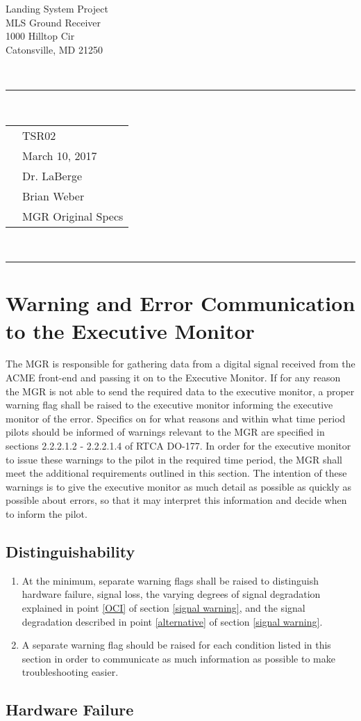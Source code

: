 \documentclass[11pt]{article}
\newcommand{\header}[5]{
\begin{centering}
\parbox{6.8in}{
\begin{flushright}
\begin{spacing}{.8}
{\fontfamily{cmss}{\large{\textbf{#1}}\\}}
\small{#2\\
#3\\
#4\\
#5}\\
\end{spacing}
\end{flushright}
\vspace{-7.5mm}
}\\
\rule{\textwidth}{0.5pt}\\
\vspace{-4mm}
\end{centering}
}
\newcommand{\documentinfo}[5]{
\begin{centering}
\parbox{6.8in}{
\begin{spacing}{1}
\begin{flushleft}
\begin{tabular}{l l}
\fontfamily{cmss}{\textbf{DOC \#: }} & #1 \\
\fontfamily{cmss}{\textbf{DATE: }} & #2 \\
\fontfamily{cmss}{\textbf{TO: }} & #3 \\
\fontfamily{cmss}{\textbf{FROM: }} & #4 \\
\fontfamily{cmss}{\textbf{SUBJECT: }} & #5 \\
\end{tabular}\\
\rule{\textwidth}{1pt}
\end{flushleft}
\end{spacing}
}
\end{centering}
}
\begin{document}
\header{CMPE349}{Landing System Project}{MLS Ground Receiver}{1000 Hilltop Cir}{Catonsville, MD 21250}

\documentinfo{TSR02}{March 10, 2017}{Dr. LaBerge}{Brian Weber}{MGR Original Specs}

\section{Warning and Error Communication to the Executive Monitor}
The MGR is responsible for gathering data from a digital signal received from the ACME front-end and passing it on to the Executive Monitor. If for any reason the MGR is not able to send the required data to the executive monitor, a proper warning flag shall be raised to the executive monitor informing the executive monitor of the error. Specifics on for what reasons and within what time period pilots should be informed of warnings relevant to the MGR are specified in sections 2.2.2.1.2 - 2.2.2.1.4 of RTCA DO-177. In order for the executive monitor to issue these warnings to the pilot in the required time period, the MGR shall meet the additional requirements outlined in this section. The intention of these warnings is to give the executive monitor as much detail as possible as quickly as possible about errors, so that it may interpret this information and decide when to inform the pilot.

\subsection{Distinguishability}
\begin{enumerate}

	\item At the minimum, separate warning flags shall be raised to distinguish hardware failure, signal loss, the varying degrees of signal degradation explained in point \ref{OCI} of section  \ref{signal warning}, and the signal degradation described in point \ref{alternative} of section \ref{signal warning}.

	\item A separate warning flag should be raised for each condition listed in this section in order to communicate as much information as possible to make troubleshooting easier.

\end{enumerate}

\subsection{Hardware Failure}
\end{document}
